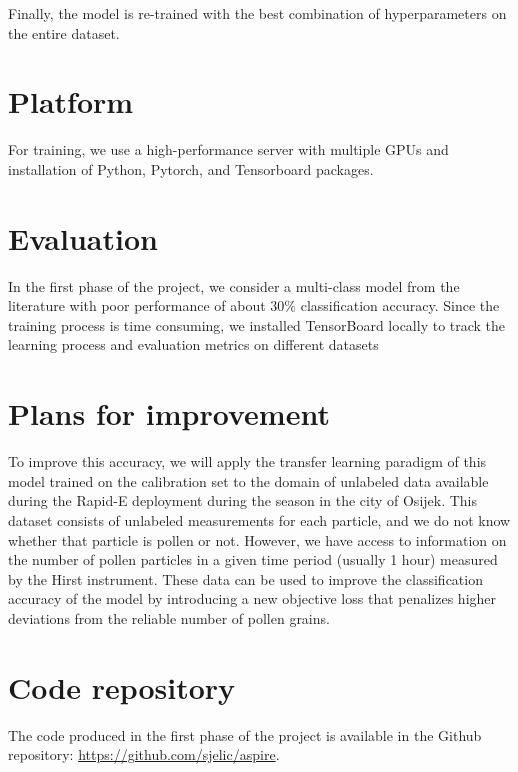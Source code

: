 \documentclass{article}
\begin{document}
Finally, the model is re-trained with the best combination of hyperparameters on the entire dataset.



\section{Platform}
For training, we use a high-performance server with multiple GPUs and installation of Python, Pytorch, and Tensorboard packages.

\section{Evaluation}

In the first phase of the project, we consider a multi-class model from the literature with poor performance of about $30\%$ classification accuracy. Since the training process is time consuming, we installed TensorBoard locally to track the learning process and evaluation metrics on different datasets 

\section{Plans for improvement}
To improve this accuracy, we will apply the transfer learning paradigm of this model trained on the calibration set to the domain of unlabeled data available during the Rapid-E deployment during the season in the city of Osijek. This dataset consists of unlabeled measurements for each particle, and we do not know whether that particle is pollen or not. However, we have access to information on the number of pollen particles in a given time period (usually 1 hour) measured by the Hirst instrument. These data can be used to improve the classification accuracy of the model by introducing a new objective loss that penalizes higher deviations from the reliable number of pollen grains.

\section{Code repository}

The code produced in the first phase of the project is available in the Github repository: \url{https://github.com/sjelic/aspire}.




\end{document}
